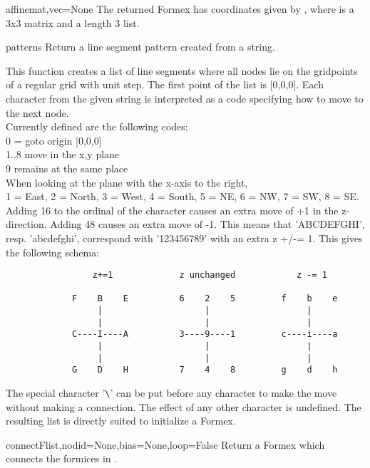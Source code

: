 {{\begin{methoddesc}  {affine}{mat,vec=None}
The returned Formex has coordinates given by , where  is a 3x3 matrix and  a length 3 list.
\end{methoddesc}



\begin{funcdesc}  {pattern}{s}
Return a line segment pattern created from a string.

This function creates a list of line segments where all nodes lie on the gridpoints of a regular grid with unit step.
The first point of the list is [0,0,0]. Each character from the given string is interpreted as a code specifying how to move to the next node.\\
Currently defined are the following codes:\\
0 = goto origin [0,0,0]\\
1..8 move in the x,y plane\\
9 remains at the same place\\
When looking at the plane with the x-axis to the right,\\
1 = East, 2 = North, 3 = West, 4 = South, 5 = NE, 6 = NW, 7 = SW, 8 = SE.\\
Adding 16 to the ordinal of the character causes an extra move of +1 in the z-direction. Adding 48 causes an extra move of -1. This means that 'ABCDEFGHI', resp. 'abcdefghi', correspond with '123456789' with an extra z +/-= 1. This gives the following schema:
\begin{verbatim}
                 z+=1             z unchanged            z -= 1
            
             F    B    E          6    2    5         f    b    e 
                  |                    |                   |     
                  |                    |                   |     
             C----I----A          3----9----1         c----i----a  
                  |                    |                   |     
                  |                    |                   |     
             G    D    H          7    4    8         g    d    h
\end{verbatim}             
The special character '\verb?\?' can be put before any character to make the move without making a connection. The effect of any other character is undefined. The resulting list is directly suited to initialize a Formex.
\end{funcdesc}

\begin{funcdesc}  {connect}{Flist,nodid=None,bias=None,loop=False}
Return a Formex which connects the formices in .


\end{funcdesc}}}
